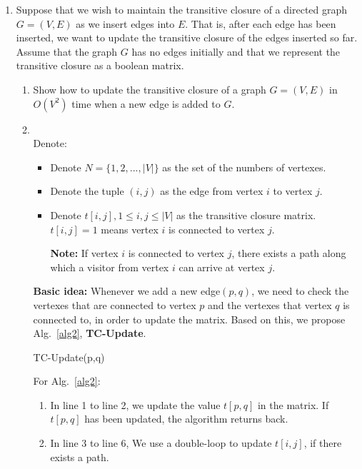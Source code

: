 \documentclass[12pt,a4paper]{article}
\makeatletter
\newtheorem*{solution}{Solution}
\theoremstyle{definition}
\renewenvironment{solution}[1][Solution] {\par\pushQED{\qed}\normalfont\topsep6\p@\@plus6\p@\relax\trivlist\item[\hskip\labelsep\bfseries#1\@addpunct{.}]\ignorespaces}{\popQED\endtrivlist\@endpefalse} \makeatother
\makeatother
\begin{document}
\begin{enumerate}
	\item Suppose that we wish to maintain the transitive closure of a directed graph $G=(V,E)$ as we insert edges into $E$. That is, after each edge has been inserted, we want to update the transitive closure of the edges inserted so far. Assume that the graph $G$ has no edges initially and that we represent the transitive closure as a boolean matrix.
	\begin{enumerate}
	    \item Show how to update the transitive closure of a graph $G=(V,E)$ in $O(V^2)$ time when a new edge is added to $G$.
	    \begin{solution}
	    ~\\
	    Denote:
	    \begin{itemize}
	        \item 

	    Denote $N=\{1,2,...,|V|\}$ as the set of the numbers of vertexes.
	    \item
	    Denote the tuple $(i,j)$ as the edge from vertex $i$ to vertex $j$.
	    \item
	    Denote $t[i,j],1\leq i,j\leq |V|$ as the transitive closure matrix. $t[i,j]=1$ means vertex $i$ is connected to vertex $j$.
	    
	    
	    \textbf{Note:} If vertex $i$ is connected to vertex $j$, there exists a path along which a visitor from vertex $i$ can arrive at vertex $j$.
	    	    \end{itemize}
	    \textbf{Basic idea:} Whenever we add a new edge$(p,q)$, we need to check the vertexes that are connected to vertex $p$ and the vertexes that vertex $q$ is connected to, in order to update the matrix. Based on this, we propose Alg.~\ref{alg2}, \textbf{TC-Update}. 
	    
	    
	    
	   \begin{algorithm}[H]
	   \caption{TC-Update(p,q)}
	   \label{alg2}
	   \end{algorithm}
	  
	   For Alg.~\ref{alg2}:
	   \begin{enumerate}
	       \item In line 1 to line 2, we update the value $t[p,q]$ in the matrix. If $t[p,q]$ has been updated, the algorithm returns back.
	       
	       \item In line 3 to line 6, We use a double-loop to update $t[i,j]$, if there exists a path.
	       

\end{enumerate}
\end{solution}
\end{enumerate}
\end{enumerate}
\end{document}

